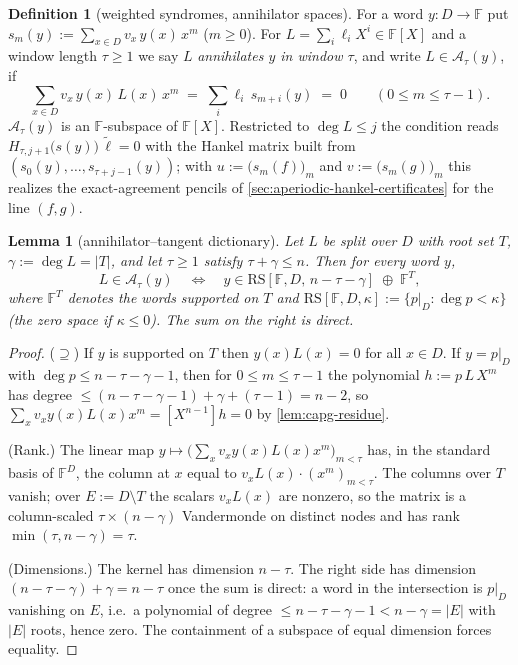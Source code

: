 \documentclass[11pt]{article}
\newtheorem{lemma}[lemma]{Lemma}
\theoremstyle{definition}
\newtheorem{definition}[definition]{Definition}
\theoremstyle{remark}
\newcommand{\F}{\mathbb{F}}
\begin{document}
\begin{definition}[weighted syndromes, annihilator spaces]\label{def:capg-syndrome}
For a word $y\colon D\to\F$ put $s_m(y):=\sum_{x\in D}v_x\,y(x)\,x^m$
($m\geq 0$).  For $L=\sum_i \ell_i X^i\in\F[X]$ and a window length
$\tau\geq 1$ we say $L$ \emph{annihilates $y$ in window $\tau$}, and write
$L\in\mathcal{A}_\tau(y)$, if
\[
\sum_{x\in D} v_x\,y(x)\,L(x)\,x^m \;=\;\sum_i \ell_i\, s_{m+i}(y)\;=\;0
\qquad (0\leq m\leq \tau-1).
\]
$\mathcal{A}_\tau(y)$ is an $\F$-subspace of $\F[X]$.  Restricted to
$\deg L\leq j$ the condition reads $H_{\tau,j+1}\big(s(y)\big)\,\tilde\ell=0$
with the Hankel matrix built from $(s_0(y),\dots,s_{\tau+j-1}(y))$; with
$u:=\big(s_m(f)\big)_m$ and $v:=\big(s_m(g)\big)_m$ this realizes the
exact-agreement pencils of \cref{sec:aperiodic-hankel-certificates} for the
line $(f,g)$.
\end{definition}

\begin{lemma}[annihilator--tangent dictionary]\label{lem:capg-dictionary}
Let $L$ be split over $D$ with root set $T$, $\gamma:=\deg L=|T|$, and let
$\tau\geq 1$ satisfy $\tau+\gamma\leq n$.  Then for every word $y$,
\[
L\in\mathcal{A}_\tau(y)
\quad\Longleftrightarrow\quad
y\in \mathrm{RS}[\F,D,\,n-\tau-\gamma]\;\oplus\;\F^{T},
\]
where $\F^{T}$ denotes the words supported on $T$ and
$\mathrm{RS}[\F,D,\kappa]:=\{p|_D:\deg p<\kappa\}$ (the zero space if
$\kappa\leq 0$).  The sum on the right is direct.
\end{lemma}

\begin{proof}
($\supseteq$) If $y$ is supported on $T$ then $y(x)L(x)=0$ for all $x\in D$.
If $y=p|_D$ with $\deg p\leq n-\tau-\gamma-1$, then for $0\leq m\leq\tau-1$
the polynomial $h:=p\,L\,X^{m}$ has degree
$\leq (n-\tau-\gamma-1)+\gamma+(\tau-1)=n-2$, so
$\sum_x v_x y(x)L(x)x^m=[X^{n-1}]h=0$ by \cref{lem:capg-residue}.

(Rank.)  The linear map $y\mapsto\big(\sum_x v_xy(x)L(x)x^m\big)_{m<\tau}$
has, in the standard basis of $\F^D$, the column at $x$ equal to
$v_xL(x)\cdot(x^m)_{m<\tau}$.  The columns over $T$ vanish; over
$E:=D\setminus T$ the scalars $v_xL(x)$ are nonzero, so the matrix is a
column-scaled $\tau\times(n-\gamma)$ Vandermonde on distinct nodes and has
rank $\min(\tau,n-\gamma)=\tau$.

(Dimensions.)  The kernel has dimension $n-\tau$.  The right side has
dimension $(n-\tau-\gamma)+\gamma=n-\tau$ once the sum is direct: a word in
the intersection is $p|_D$ vanishing on $E$, i.e.\ a polynomial of degree
$\leq n-\tau-\gamma-1<n-\gamma=|E|$ with $|E|$ roots, hence zero.  The
containment of a subspace of equal dimension forces equality.
\end{proof}
\end{document}
